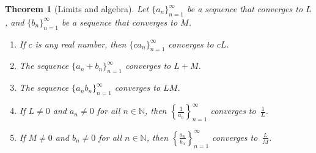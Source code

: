 \documentclass[12pt]{amsart}
\newcommand{\N}{\mathbb{N}}
\numberwithin{equation}{section}
\theoremstyle{plain} %
\newtheorem{thm}[equation]{Theorem}
\theoremstyle{definition}
\theoremstyle{remark}
\begin{document}
\begin{thm}[Limits and algebra]\label{thm99}
Let $\{a_n\}_{n=1}^\infty$ be a sequence that converges to $L$, and $\{b_n\}_{n=1}^\infty$ be a sequence that converges to $M$.
\begin{enumerate}
\item If $c$ is any real number, then $\{ c a_n\}_{n=1}^\infty$ converges to $cL$.
\item The sequence $\{a_n + b_n\}_{n=1}^\infty$ converges to $L+M$.
\item The sequence $\{a_n b_n\}_{n=1}^\infty$ converges to $LM$.
\item If $L\neq 0$ and $a_n\neq 0$ for all $n\in \N$, then $\displaystyle\left\{\frac{1}{a_n}\right\}_{n=1}^\infty$\!\!\! converges to~$\displaystyle \frac{1}{L}$.
\item If $M\neq 0$ and $b_n\neq 0$ for all $n\in \N$, then $\displaystyle\left\{\frac{a_n}{b_n}\right\}_{n=1}^\infty$\!\!\! converges to~$\displaystyle \frac{L}{M}$.
\end{enumerate}
\end{thm}
\end{document}
